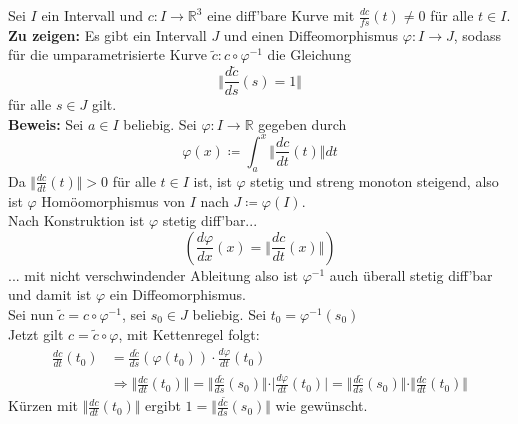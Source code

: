 \begin{problem*}[3]
Sei $ I $ ein Intervall und $c: I \to \mathbb{R}^3 $ eine diff'bare Kurve mit $\frac{dc}{fs}(t) \neq 0$ für alle $ t \in I $.\\
\textbf{Zu zeigen:} Es gibt ein Intervall $ J $ und einen Diffeomorphismus $\varphi : I \to J$, sodass für die umparametrisierte Kurve $ \tilde{ c }: c \circ \varphi^{ -1 } $ die Gleichung 
\begin{equation*}
  \Vert \frac{d\tilde{ c }}{ds}(s) = 1 \Vert
\end{equation*}
für alle $ s \in J $ gilt.\\
\textbf{Beweis:} Sei $ a \in I$ beliebig. Sei $ \varphi: I \to \mathbb{R}$ gegeben durch 
\begin{equation*}
  \varphi(x) \coloneqq \int_a^x { \Vert \frac{dc}{dt}(t) \Vert }dt
\end{equation*}
Da $ \Vert \frac{dc}{dt}(t)  \Vert > 0$ für alle $ t \in I $ ist, ist $ \varphi$ stetig und streng monoton steigend, also ist $ \varphi $ Homöomorphismus von $ I $ nach $ J \coloneqq \varphi (I)$.\\
Nach Konstruktion ist $\varphi$ stetig diff'bar...
\begin{equation*}
  \left( \frac{d \varphi}{dx}(x) = \Vert \frac{dc}{dt}(x) \Vert\right)
\end{equation*}
... mit nicht verschwindender Ableitung also ist $\varphi^{ -1 }$ auch überall stetig diff'bar und damit ist $\varphi$ ein Diffeomorphismus.\\
Sei nun $ \tilde{ c } = c \circ \varphi^{ -1 }$, sei $s_0 \in J$ beliebig. Sei $t_0 = \varphi^{ -1 }(s_0)$\\
Jetzt gilt $c = \tilde{ c } \circ \varphi$, mit Kettenregel folgt:
\begin{align*}
\frac{dc}{dt}(t_0) &= \frac{d \tilde{ c }}{ds}(\varphi(t_0))\cdot \frac{d \varphi}{dt}(t_0) \\
&\Rightarrow \Vert \frac{dc}{dt}(t_0)\Vert = \Vert \frac{d \tilde{ c }}{ds}(s_0) \Vert \cdot \vert \frac{d \varphi}{dt}(t_0) \vert = \Vert \frac{d \tilde{ c }}{ds}(s_0) \Vert \cdot \Vert \frac{dc}{dt}(t_0) \Vert
\end{align*}
Kürzen mit $\Vert \frac{dc}{dt} (t_0) \Vert $
ergibt $ 1 = \Vert \frac{d \tilde{ c }}{ds}(s_0) \Vert $ wie gewünscht.\\

\end{problem*}


